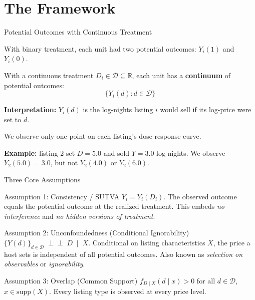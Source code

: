 \documentclass[aspectratio=169, 11pt]{beamer}
\newcommand{\indep}{\perp\!\!\!\perp}
\begin{document}
\section{The Framework}

\begin{frame}{Potential Outcomes with Continuous Treatment}

With binary treatment, each unit had two potential outcomes: $Y_i(1)$ and $Y_i(0)$.

\bigskip

With a continuous treatment $D_i \in \mathcal{D} \subseteq \mathbb{R}$, each unit has a \textbf{continuum} of potential outcomes:
\[
\{Y_i(d) : d \in \mathcal{D}\}
\]

\textbf{Interpretation:} $Y_i(d)$ is the log-nights listing $i$ would sell if its log-price were set to $d$.

\bigskip
\pause

We observe only one point on each listing's dose-response curve.

\bigskip

\textbf{Example:} listing 2 set $D = 5.0$ and sold $Y = 3.0$ log-nights. We observe $Y_2(5.0) = 3.0$, but not $Y_2(4.0)$ or $Y_2(6.0)$.

\end{frame}

\begin{frame}{Three Core Assumptions}

\begin{block}{Assumption 1: Consistency / SUTVA}
$Y_i = Y_i(D_i)$. The observed outcome equals the potential outcome at the realized treatment. This embeds \emph{no interference} and \emph{no hidden versions of treatment}.
\end{block}

\pause

\begin{block}{Assumption 2: Unconfoundedness (Conditional Ignorability)}
$\{Y(d)\}_{d \in \mathcal{D}} \;\indep\; D \;\mid\; X$.
Conditional on listing characteristics $X$, the price a host sets is independent of all potential outcomes. Also known as \emph{selection on observables} or \emph{ignorability}.
\end{block}

\pause

\begin{block}{Assumption 3: Overlap (Common Support)}
$f_{D \mid X}(d \mid x) > 0$ for all $d \in \mathcal{D}$, $x \in \mathrm{supp}(X)$.
Every listing type is observed at every price level.
\end{block}

\end{frame}
\end{document}
